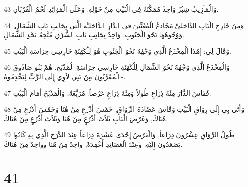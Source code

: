 \par 43 وَالْمَآزِيبُ شِبْرٌ وَاحِدٌ مُمَكَّنَةً فِي الْبَيْتِ مِنْ حَوْلِهِ. وَعَلَى الْمَوَائِدِ لَحْمُ الْقُرْبَانِ.
\par 44 وَمِنْ خَارِجِ الْبَابِ الدَّاخِلِيِّ مَخَادِعُ الْمُغَنِّينَ فِي الدَّارِ الدَّاخِلِيَّةِ الَّتِي بِجَانِبِ بَابِ الشِّمَالِ, وَوُجُوهُهَا نَحْوَ الْجَنُوبِ. وَاحِدٌ بِجَانِبِ بَابِ الشَّرْقِ مُتَّجِهٌ نَحْوَ الشِّمَالِ.
\par 45 وَقَالَ لِي: [هَذَا الْمِخْدَعُ الَّذِي وَجْهُهُ نَحْوَ الْجَنُوبِ هُوَ لِلْكَهَنَةِ حَارِسِي حِرَاسَةِ الْبَيْتِ.
\par 46 وَالْمِخْدَعُ الَّذِي وَجْهُهُ نَحْوَ الشِّمَالِ لِلْكَهَنَةِ حَارِسِي حِرَاسَةِ الْمَذْبَحِ. هُمْ بَنُو صَادُوقَ الْمُقَرَّبُونَ مِنْ بَنِي لاَوِي إِلَى الرَّبِّ لِيَخْدِمُوهُ».
\par 47 فَقَاسَ الدَّارَ مِئَةَ ذِرَاعٍ طُولاً وَمِئَةَ ذِرَاعٍ عَرْضاً, مُرَبَّعَةً, وَالْمَذْبَحَ أَمَامَ الْبَيْتِ.
\par 48 وَأَتَى بِي إِلَى رِوَاقِ الْبَيْتِ وَقَاسَ عَضَادَةَ الرِّوَاقِ, خَمْسَ أَذْرُعٍ مِنْ هُنَا وَخَمْسَ أَذْرُعٍ مِنْ هُنَاكَ, وَعَرْضَ الْبَابِ ثَلاَثَ أَذْرُعٍ مِنْ هُنَا وَثَلاَثَ أَذْرُعٍ مِنْ هُنَاكَ.
\par 49 طُولُ الرِّوَاقِ عِشْرُونَ ذِرَاعاً, وَالْعَرْضُ إِحْدَى عَشَرَةَ ذِرَاعاً عِنْدَ الدَّرَجِ الَّذِي بِهِ كَانُوا يَصْعَدُونَ إِلَيْهِ. وَعِنْدَ الْعَضَائِدِ أَعْمِدَةٌ, وَاحِدٌ مِنْ هُنَا وَوَاحِدٌ مِنْ هُنَاكَ.

\chapter{41}

